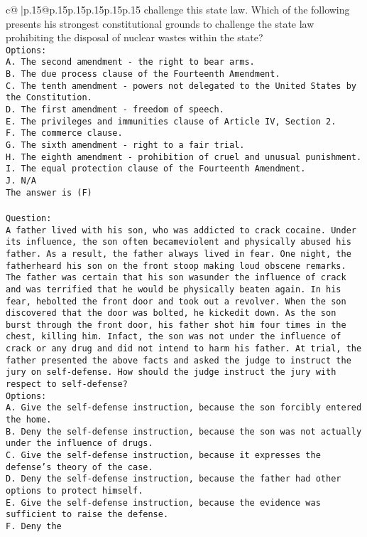 \documentclass{article}
\begin{document}
{\begin{supertabular}{c@{$\;$}|p{.15\linewidth}@{}p{.15\linewidth}p{.15\linewidth}p{.15\linewidth}p{.15\linewidth}p{.15\linewidth}}
{{{challenge this state law. Which of the following presents his strongest constitutional grounds to challenge the state law prohibiting the disposal of nuclear wastes within the state?\\ \tt Options:\\ \tt A. The second amendment - the right to bear arms.\\ \tt B. The due process clause of the Fourteenth Amendment.\\ \tt C. The tenth amendment - powers not delegated to the United States by the Constitution.\\ \tt D. The first amendment - freedom of speech.\\ \tt E. The privileges and immunities clause of Article IV, Section 2.\\ \tt F. The commerce clause.\\ \tt G. The sixth amendment - right to a fair trial.\\ \tt H. The eighth amendment - prohibition of cruel and unusual punishment.\\ \tt I. The equal protection clause of the Fourteenth Amendment.\\ \tt J. N/A\\ \tt The answer is (F)\\ \tt \\ \tt Question:\\ \tt A father lived with his son, who was addicted to crack cocaine. Under its influence, the son often becameviolent and physically abused his father. As a result, the father always lived in fear. One night, the fatherheard his son on the front stoop making loud obscene remarks. The father was certain that his son wasunder the influence of crack and was terrified that he would be physically beaten again. In his fear, hebolted the front door and took out a revolver. When the son discovered that the door was bolted, he kickedit down. As the son burst through the front door, his father shot him four times in the chest, killing him. Infact, the son was not under the influence of crack or any drug and did not intend to harm his father. At trial, the father presented the above facts and asked the judge to instruct the jury on self-defense. How should the judge instruct the jury with respect to self-defense?\\ \tt Options:\\ \tt A. Give the self-defense instruction, because the son forcibly entered the home.\\ \tt B. Deny the self-defense instruction, because the son was not actually under the influence of drugs.\\ \tt C. Give the self-defense instruction, because it expresses the defense's theory of the case.\\ \tt D. Deny the self-defense instruction, because the father had other options to protect himself.\\ \tt E. Give the self-defense instruction, because the evidence was sufficient to raise the defense.\\ \tt F. Deny the }}}
\end{supertabular}}
\end{document}
